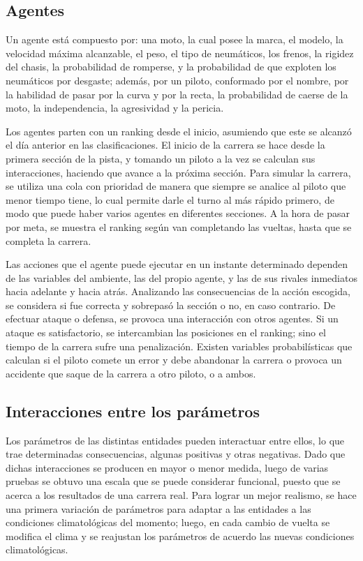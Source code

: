 \documentclass[12pt, letterpaper,spanish]{article}
\theoremstyle{definition}
\theoremstyle{remark}
\begin{document}
	\subsection{Agentes}
		Un agente está compuesto por: una moto, la cual posee la marca, el modelo, la velocidad máxima alcanzable, el peso, el tipo de neumáticos, los frenos, la rigidez del chasis, la probabilidad de romperse, y la probabilidad de que exploten los neumáticos por desgaste; además, por un piloto, conformado por el nombre, por la habilidad de pasar por la curva y por la recta, la probabilidad de caerse de la moto, la independencia, la agresividad y la pericia. 

		Los agentes parten con un ranking desde el inicio, asumiendo que este se alcanzó el día anterior en las clasificaciones. El inicio de la carrera se hace desde la primera sección de la pista, y tomando un piloto a la vez se calculan sus interacciones, haciendo que avance a la próxima sección. Para simular la carrera, se utiliza una cola con prioridad de manera que siempre se analice al piloto que menor tiempo tiene, lo cual permite darle el turno al más rápido primero, de modo que puede haber varios agentes en diferentes secciones. A la hora de pasar por meta, se muestra el ranking según van completando las vueltas, hasta que se completa la carrera.

		 Las acciones que el agente puede ejecutar en un instante determinado dependen de las variables del ambiente, las del propio agente, y las de sus rivales inmediatos hacia adelante y hacia atrás. Analizando las consecuencias de la acción escogida, se considera si fue correcta y sobrepasó la sección o no, en caso contrario. De efectuar ataque o defensa, se provoca una interacción con otros agentes. Si un ataque es satisfactorio, se intercambian las posiciones en el ranking; sino el tiempo de la carrera sufre una penalización. Existen variables probabilísticas que calculan si el piloto comete un error y debe abandonar la carrera o provoca un accidente que saque de la carrera a otro piloto, o a ambos.
	
	\subsection{Interacciones entre los parámetros}
		Los parámetros de las distintas entidades pueden interactuar entre ellos, lo que trae determinadas consecuencias, algunas positivas y otras negativas. Dado que dichas interacciones se producen en mayor o menor medida, luego de varias pruebas se obtuvo una escala que se puede considerar funcional, puesto que se acerca a los resultados de una carrera real. Para lograr un mejor realismo, se hace una primera variación de parámetros para adaptar a las entidades a las condiciones climatológicas del momento; luego, en cada cambio de vuelta se modifica el clima y se reajustan los parámetros de acuerdo las nuevas condiciones climatológicas.
\end{document}
